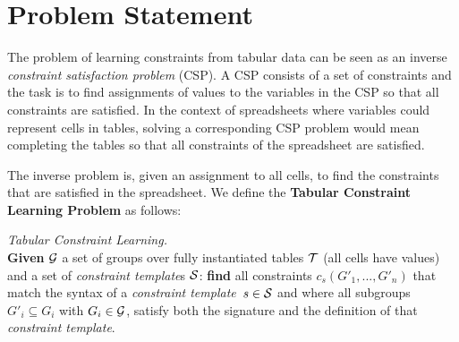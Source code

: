 \documentclass{sig-alternate-05-2015}
\newcommand{\sergey}[1]{\textcolor{magenta}{{\sc Sergey:} #1}\xspace}
\newcommand{\format}[1]{\textit{#1}\xspace}
\newcommand{\template}{\format{constraint template}}
\newcommand{\CSignature}{Signature\xspace}
\newcommand{\CFunction}{Definition\xspace}
\newcommand{\groups}{\ensuremath{\mathcal{G}}\xspace}
\begin{document}

\section{Problem Statement}\label{sec:problem_statement}
The problem of learning constraints from tabular data can be seen as an inverse {\em constraint satisfaction problem} (CSP). A CSP consists of a set of constraints and the
task is to find assignments of values to the variables in the CSP so that all constraints are satisfied.
In the context of spreadsheets where variables could represent cells in tables, solving a corresponding CSP problem would mean completing the tables so that all constraints of the spreadsheet are satisfied.

The inverse problem is, given an assignment to all cells, to find the constraints that are satisfied in the spreadsheet.
We define the {\bf Tabular Constraint Learning Problem} as follows:
%
\begin{definition} \textit{Tabular Constraint Learning.}\label{def:problem_statement}\\
{\bf   Given} ${\cal G}$ a set of groups over fully instantiated tables ${\cal T}$ (all cells have values) and a set of {\template}s ${\cal S}$: {\bf find } all constraints $c_s(G'_1, ..., G'_n)$ that match the syntax of a \template~$s \in {\cal S}$ and where all subgroups $G'_i \subseteq G_i$ with $G_i \in {\cal G}$, satisfy both the signature and the definition of that \template.
\end{definition}
\end{document}
